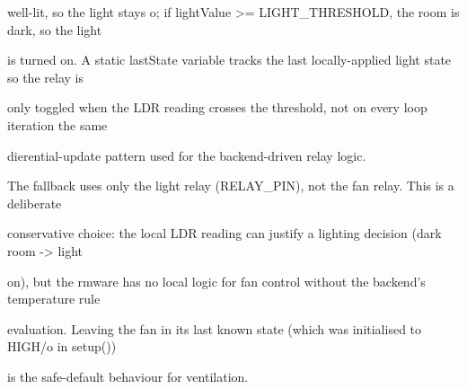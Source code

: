 well-lit, so the light stays o; if lightValue >= LIGHT\_THRESHOLD, the room is dark, so the light

is turned on. A static lastState variable tracks the last locally-applied light state so the relay is

only toggled when the LDR reading crosses the threshold, not on every loop iteration  the same

dierential-update pattern used for the backend-driven relay logic.

The fallback uses only the light relay (RELAY\_PIN), not the fan relay. This is a deliberate

conservative choice: the local LDR reading can justify a lighting decision (dark room -> light

on), but the rmware has no local logic for fan control without the backend's temperature rule

evaluation. Leaving the fan in its last known state (which was initialised to HIGH/o in setup())

is the safe-default behaviour for ventilation.

